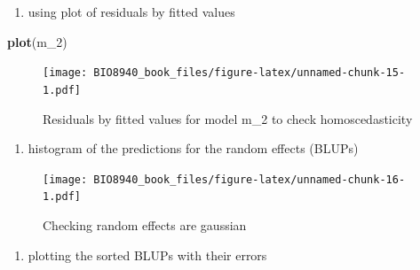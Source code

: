 \documentclass[
  12pt,
]{book}
\newenvironment{Shaded}{\begin{snugshade}}{\end{snugshade}}
\newcommand{\CommentTok}[1]{\textcolor[rgb]{0.56,0.35,0.01}{\textit{#1}}}
\newcommand{\DataTypeTok}[1]{\textcolor[rgb]{0.13,0.29,0.53}{#1}}
\newcommand{\DecValTok}[1]{\textcolor[rgb]{0.00,0.00,0.81}{#1}}
\newcommand{\KeywordTok}[1]{\textcolor[rgb]{0.13,0.29,0.53}{\textbf{#1}}}
\newcommand{\NormalTok}[1]{#1}
\newcommand{\OperatorTok}[1]{\textcolor[rgb]{0.81,0.36,0.00}{\textbf{#1}}}
\newcommand{\OtherTok}[1]{\textcolor[rgb]{0.56,0.35,0.01}{#1}}
\newcommand{\StringTok}[1]{\textcolor[rgb]{0.31,0.60,0.02}{#1}}
\providecommand{\tightlist}{%
  \setlength{\itemsep}{0pt}\setlength{\parskip}{0pt}}
\begin{document}
\begin{enumerate}
\def\labelenumi{\arabic{enumi}.}
\setcounter{enumi}{3}
\tightlist
\item
  using plot of residuals by fitted values
\end{enumerate}

\begin{Shaded}
\begin{Highlighting}[]
\KeywordTok{plot}\NormalTok{(m_}\DecValTok{2}\NormalTok{)}
\end{Highlighting}
\end{Shaded}

\begin{figure}
\centering
\texttt{[image: BIO8940\_book\_files/figure-latex/unnamed-chunk-15-1.pdf]}
\caption{\label{fig:unnamed-chunk-15}Residuals by fitted values for model m\_2 to check homoscedasticity}
\end{figure}

\begin{enumerate}
\def\labelenumi{\arabic{enumi}.}
\setcounter{enumi}{4}
\tightlist
\item
  histogram of the predictions for the random effects (BLUPs)
\end{enumerate}

\begin{Shaded}
\end{Shaded}

\begin{figure}
\centering
\texttt{[image: BIO8940\_book\_files/figure-latex/unnamed-chunk-16-1.pdf]}
\caption{\label{fig:unnamed-chunk-16}Checking random effects are gaussian}
\end{figure}

\begin{enumerate}
\def\labelenumi{\arabic{enumi}.}
\setcounter{enumi}{5}
\tightlist
\item
  plotting the sorted BLUPs with their errors
\end{enumerate}
\end{document}
